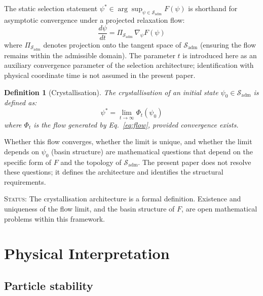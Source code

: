 \documentclass[12pt]{article}
\newtheorem{definition}[theorem]{Definition}
\begin{document}
The static selection statement $\psi^* \in \arg\sup_{\psi \in \mathcal{S}_{\mathrm{adm}}} F(\psi)$ is shorthand for asymptotic convergence under a projected relaxation flow:
\begin{equation}\label{eq:flow}
    \frac{d\psi}{dt} = \Pi_{\mathcal{S}_{\mathrm{adm}}}\, \nabla_\psi F(\psi)
\end{equation}
where $\Pi_{\mathcal{S}_{\mathrm{adm}}}$ denotes projection onto the tangent space of $\mathcal{S}_{\mathrm{adm}}$ (ensuring the flow remains within the admissible domain). The parameter $t$ is introduced here as an auxiliary convergence parameter of the selection architecture; identification with physical coordinate time is not assumed in the present paper.

\begin{definition}[Crystallisation]\label{def:crystal}
The crystallisation of an initial state $\psi_0 \in \mathcal{S}_{\mathrm{adm}}$ is defined as:
\begin{equation}\label{eq:crystal}
    \psi^* = \lim_{t \to \infty} \Phi_t(\psi_0)
\end{equation}
where $\Phi_t$ is the flow generated by Eq.~\eqref{eq:flow}, provided convergence exists.
\end{definition}

Whether this flow converges, whether the limit is unique, and whether the limit depends on $\psi_0$ (basin structure) are mathematical questions that depend on the specific form of $F$ and the topology of $\mathcal{S}_{\mathrm{adm}}$. The present paper does not resolve these questions; it defines the architecture and identifies the structural requirements.

\textsc{Status:} The crystallisation architecture is a formal definition. Existence and uniqueness of the flow limit, and the basin structure of $F$, are open mathematical problems within this framework.

\section{Physical Interpretation}\label{sec:physics}

\subsection{Particle stability}
\end{document}
